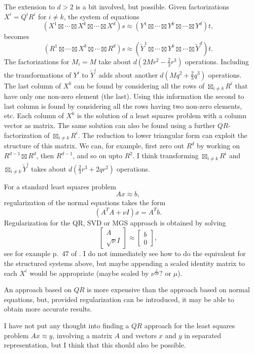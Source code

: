\documentclass[12pt]{artikel3}
\newcommand{\bigboxtimes}{\boxtimes}
\begin{document}
The extension to \(d > 2\) is a bit involved, but possible. Given
factorizations \(X^i = Q^i R^i\) for \(i \neq k\), the system of
equations
\[ ( X^1 \boxtimes \dotsb \boxtimes X^k \boxtimes \dotsb \boxtimes X^d ) s 
\approx
( Y^1 \boxtimes \dotsb \boxtimes Y^k 
\boxtimes \dotsb \boxtimes Y^d ) t,\]
becomes
\[ ( R^1 \boxtimes \dotsb \boxtimes X^k \boxtimes \dotsb \boxtimes R^d ) s 
\approx
( \tilde{Y}^1 \boxtimes \dotsb \boxtimes Y^k 
\boxtimes \dotsb \boxtimes \tilde{Y}^d ) t.\]
The factorizations for \(M_i = M\) take about \(d (2Mr^2 - \frac{2}{3}
r^3)\) operations. Including the transformations of \(Y^i\) to
\(\tilde{Y}^i\) adds about another \(d(Mq^2+\frac{2}{3}q^3)\)
operations.  The last column of \(X^k\) can be found by considering
all the rows of \(\bigboxtimes_{i \neq k} R^i\) that have only one
non-zero element (the last). Using this information the second to last
column is found by considering all the rows having two non-zero
elements, etc. Each column of \(X^k\) is the solution of a least
squares problem with a column vector as matrix.  The same solution can
also be found using a further \(QR\)-factorization of
\(\bigboxtimes_{i \neq k} R^i\). The reduction to lower triangular
form can exploit the structure of this matrix. We can, for example,
first zero out \(R^d\) by working on \(R^{d-1} \boxtimes R^d\), then
\(R^{d-1}\), and so on upto \(R^2\). I think transforming
\(\bigboxtimes_{i \neq k} R^i\) and \(\bigboxtimes_{i \neq k}
\tilde{Y}^i\) takes about \(d(\frac{2}{3} r^3 + 2 q r^2)\) operations.

For a standard least squares problem
\[Ax \approx b,\]
regularization of the normal equations takes the form
\[(A^T A + \nu I) x = A^T b.\]
Regularization for the QR, SVD or MGS approach is obtained by solving
\[\left[\begin{array}{c}A \\ \sqrt{\nu} I\end{array}\right]
\approx
\left[\begin{array}{c}b \\ 0\end{array}\right],\]
see for example p.~47 of \cite{Kel99}. I do not immediately see how to
do the equivalent for the structured systems above, but maybe
appending a scaled identity matrix to each \(X^i\) would be
appropriate (maybe scaled by \(\nu^{\frac{1}{2d}}?\) or \(\mu\)).

An approach based on \(QR\) is more expensive than the approach based
on normal equations, but, provided regularization can be introduced, it
may be able to obtain more accurate results.

I have not put any thought into finding a \(QR\) approach for the
least squares problem \(A x \approx y\), involving a matrix \(A\) and
vectors \(x\) and \(y\) in separated representation, but I think that
this should also be possible.



\end{document}
